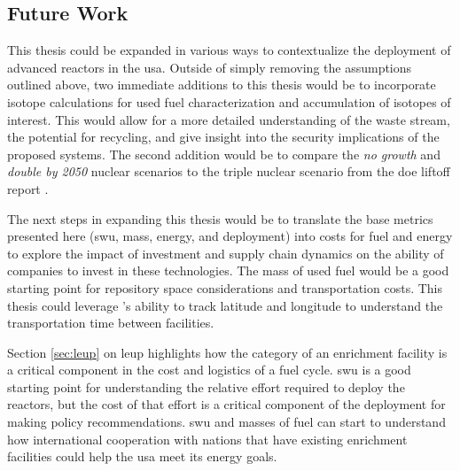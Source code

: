 


\subsection{Future Work}
\label{sec:future_work}

This thesis could be expanded in various ways to contextualize the deployment of advanced reactors in the \gls{usa}. Outside of simply removing the assumptions outlined above, two immediate additions to this thesis would be to incorporate isotope calculations for used fuel characterization and accumulation of isotopes of interest. This would allow for a more detailed understanding of the waste stream, the potential for recycling, and give insight into the security implications of the proposed systems. The second addition would be to compare the \textit{no growth} and \textit{double by 2050} nuclear scenarios to the triple nuclear scenario from the \gls{doe} liftoff report \cite{julie_liftoff_pathways_2024}.

The next steps in expanding this thesis would be to translate the base metrics presented here (\gls{swu}, mass, energy, and deployment) into costs for fuel and energy to explore the impact of investment and supply chain dynamics on the ability of companies to invest in these technologies. The mass of used fuel would be a good starting point for repository space considerations and transportation costs. This thesis could leverage \cyclus's ability to track latitude and longitude to understand the transportation time between facilities.

Section \ref{sec:leup} on \gls{leup} highlights how the category of an enrichment facility is a critical component in the cost and logistics of a fuel cycle. \gls{swu} is a good starting point for understanding the relative effort required to deploy the reactors, but the cost of that effort is a critical component of the deployment for making policy recommendations. \gls{swu} and masses of fuel can start to understand how international cooperation with nations that have existing enrichment facilities could help the \gls{usa} meet its energy goals.

